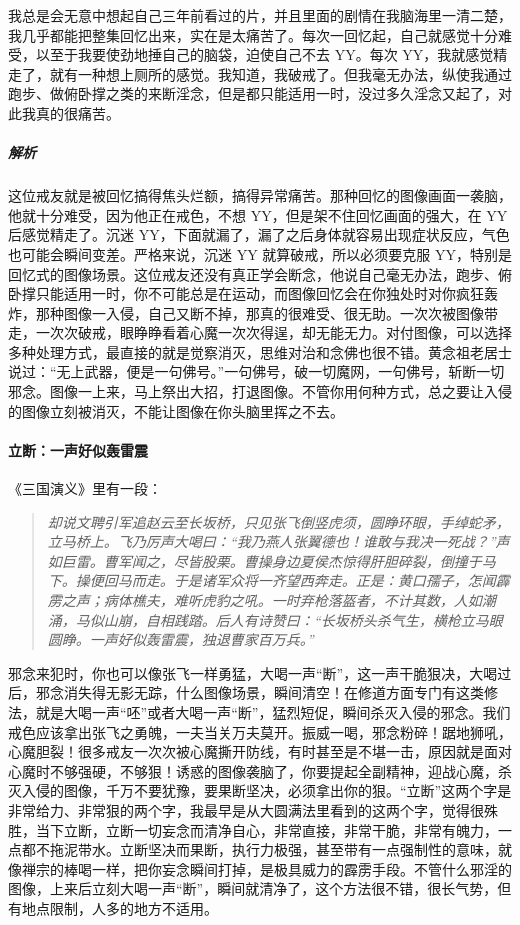 \begin{case}
    我总是会无意中想起自己三年前看过的片，并且里面的剧情在我脑海里一清二楚，我几乎都能把整集回忆出来，实在是太痛苦了。每次一回忆起，自己就感觉十分难受，以至于我要使劲地捶自己的脑袋，迫使自己不去 YY。每次 YY，我就感觉精走了，就有一种想上厕所的感觉。我知道，我破戒了。但我毫无办法，纵使我通过跑步、做俯卧撑之类的来断淫念，但是都只能适用一时，没过多久淫念又起了，对此我真的很痛苦。
    \subparagraph{解析} 这位戒友就是被回忆搞得焦头烂额，搞得异常痛苦。那种回忆的图像画面一袭脑，他就十分难受，因为他正在戒色，不想 YY，但是架不住回忆画面的强大，在 YY 后感觉精走了。沉迷 YY，下面就漏了，漏了之后身体就容易出现症状反应，气色也可能会瞬间变差。严格来说，沉迷 YY 就算破戒，所以必须要克服 YY，特别是回忆式的图像场景。这位戒友还没有真正学会断念，他说自己毫无办法，跑步、俯卧撑只能适用一时，你不可能总是在运动，而图像回忆会在你独处时对你疯狂轰炸，那种图像一入侵，自己又断不掉，那真的很难受、很无助。一次次被图像带走，一次次破戒，眼睁睁看着心魔一次次得逞，却无能无力。对付图像，可以选择多种处理方式，最直接的就是觉察消灭，思维对治和念佛也很不错。黄念祖老居士说过：“无上武器，便是一句佛号。”一句佛号，破一切魔网，一句佛号，斩断一切邪念。图像一上来，马上祭出大招，打退图像。不管你用何种方式，总之要让入侵的图像立刻被消灭，不能让图像在你头脑里挥之不去。
\end{case}

\paragraph{立断：一声好似轰雷震}

《三国演义》里有一段：

\begin{quote}\it
    却说文聘引军追赵云至长坂桥，只见张飞倒竖虎须，圆睁环眼，手绰蛇矛，立马桥上。飞乃厉声大喝曰：“我乃燕人张翼德也！谁敢与我决一死战？”声如巨雷。曹军闻之，尽皆股栗。曹操身边夏侯杰惊得肝胆碎裂，倒撞于马下。操便回马而走。于是诸军众将一齐望西奔走。正是：黄口孺子，怎闻霹雳之声；病体樵夫，难听虎豹之吼。一时弃枪落盔者，不计其数，人如潮涌，马似山崩，自相践踏。后人有诗赞曰：“长坂桥头杀气生，横枪立马眼圆睁。一声好似轰雷震，独退曹家百万兵。”
\end{quote}

邪念来犯时，你也可以像张飞一样勇猛，大喝一声“断”，这一声干脆狠决，大喝过后，邪念消失得无影无踪，什么图像场景，瞬间清空！在修道方面专门有这类修法，就是大喝一声“呸”或者大喝一声“断”，猛烈短促，瞬间杀灭入侵的邪念。我们戒色应该拿出张飞之勇魄，一夫当关万夫莫开。振威一喝，邪念粉碎！踞地狮吼，心魔胆裂！很多戒友一次次被心魔撕开防线，有时甚至是不堪一击，原因就是面对心魔时不够强硬，不够狠！诱惑的图像袭脑了，你要提起全副精神，迎战心魔，杀灭入侵的图像，千万不要犹豫，要果断坚决，必须拿出你的狠。“立断”这两个字是非常给力、非常狠的两个字，我最早是从大圆满法里看到的这两个字，觉得很殊胜，当下立断，立断一切妄念而清净自心，非常直接，非常干脆，非常有魄力，一点都不拖泥带水。立断坚决而果断，执行力极强，甚至带有一点强制性的意味，就像禅宗的棒喝一样，把你妄念瞬间打掉，是极具威力的霹雳手段。不管什么邪淫的图像，上来后立刻大喝一声“断”，瞬间就清净了，这个方法很不错，很长气势，但有地点限制，人多的地方不适用。

